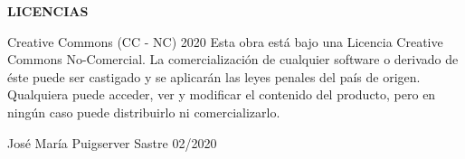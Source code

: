 {\bfseries L\+I\+C\+E\+N\+C\+I\+AS}

\begin{DoxyVerb}Creative Commons (CC - NC) 2020
Esta obra está bajo una Licencia Creative Commons No-Comercial. 
La comercialización de cualquier software  o derivado de éste puede ser castigado y se aplicarán las leyes penales
del país de origen. Qualquiera puede acceder, ver y modificar el contenido del producto, pero en ningún caso puede
distribuirlo ni comercializarlo. 

José María Puigserver Sastre
02/2020\end{DoxyVerb}
 